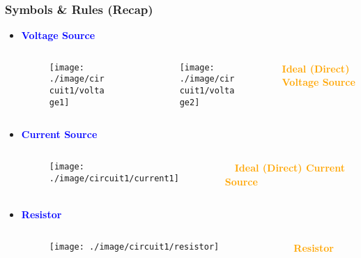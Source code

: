 \documentclass{beamer}
\newcommand{\blue}[1]{\textcolor{blue}{#1}}
\newcommand{\orange}[1]{\textcolor{orange}{#1}}
\begin{document}
\begin{frame}
\frametitle{Symbols \& Rules (Recap)}

\begin{itemize}
\item {\bf \blue{Voltage Source}}
\begin{columns}
\begin{column}{3cm}
\begin{figure}[H]
  \centering
  \texttt{[image: ./image/circuit1/voltage1]}
\end{figure}
\end{column}
\begin{column}{3cm}
\begin{figure}[H]
  \centering
  \texttt{[image: ./image/circuit1/voltage2]}
\end{figure}
\end{column}
\begin{column}{3cm}
\bf{\orange{Ideal (Direct) Voltage Source}}
\end{column}
\end{columns}
\item {\bf \blue{Current Source}}
\begin{columns}
\begin{column}{6cm}
\begin{figure}[H]
  \centering
  \texttt{[image: ./image/circuit1/current1]}
\end{figure}
\end{column}
\begin{column}{3cm}
~~\bf{\orange{Ideal (Direct) Current Source}}
\end{column}
\end{columns}
\item {\bf \blue{Resistor}}
\begin{columns}
\begin{column}{6cm}
\begin{figure}[H]
  \centering
  \texttt{[image: ./image/circuit1/resistor]}
\end{figure}
\end{column}
\begin{column}{3cm}
~~\bf{\orange{Resistor}}
\end{column}
\end{columns}
\end{itemize}

\end{frame}
\end{document}
